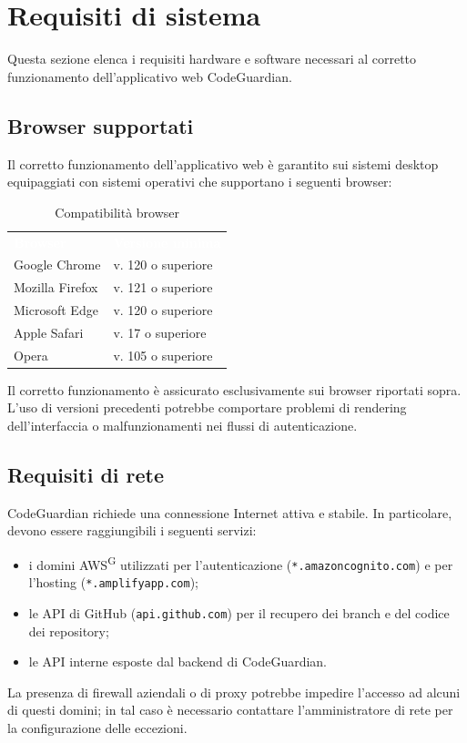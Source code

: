 \documentclass[a4paper, 11pt]{article}
\begin{document}
\section{Requisiti di sistema}

Questa sezione elenca i requisiti hardware e software necessari al corretto funzionamento dell'applicativo web CodeGuardian.

\subsection{Browser supportati}

Il corretto funzionamento dell'applicativo web è garantito sui sistemi desktop equipaggiati con sistemi operativi che supportano i seguenti browser:

\begin{table}[H]
\centering
{}
\begin{tabular}{>{\raggedright\arraybackslash}p{5cm} >{\raggedright\arraybackslash}p{6cm}}
\rowcolor{AccentColor}
\textcolor{white}{\textbf{Browser}} & \textcolor{white}{\textbf{Versione minima}} \\
Google Chrome    & v. 120 o superiore \\
Mozilla Firefox  & v. 121 o superiore \\
Microsoft Edge   & v. 120 o superiore \\
Apple Safari     & v. 17 o superiore  \\
Opera            & v. 105 o superiore  \\

\end{tabular}
\caption{Compatibilità browser}
\label{tab:browser}
\end{table}
\noindent Il corretto funzionamento è assicurato esclusivamente sui browser riportati sopra. L'uso di versioni precedenti potrebbe comportare problemi di rendering dell'interfaccia o malfunzionamenti nei flussi di autenticazione.
\subsection{Requisiti di rete}
CodeGuardian richiede una connessione Internet attiva e stabile. In particolare, devono essere raggiungibili i seguenti servizi:
\begin{itemize}
    \item i domini AWS\textsuperscript{G} utilizzati per l'autenticazione (\texttt{*.amazoncognito.com}) e per l'hosting (\texttt{*.amplifyapp.com});
    \item le API di GitHub (\texttt{api.github.com}) per il recupero dei branch e del codice dei repository;
    \item le API interne esposte dal backend di CodeGuardian.
\end{itemize}
La presenza di firewall aziendali o di proxy potrebbe impedire l'accesso ad alcuni di questi domini; in tal caso è necessario contattare l'amministratore di rete per la configurazione delle eccezioni.
\end{document}
